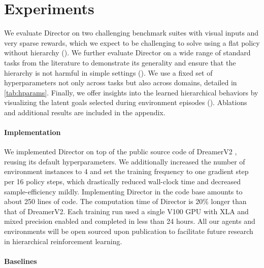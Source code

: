 


% 


\section{Experiments}
\label{sec:experiments}

We evaluate Director on two challenging benchmark suites with visual inputs and very sparse rewards, which we expect to be challenging to solve using a flat policy without hierarchy ().
We further evaluate Director on a wide range of standard tasks from the literature to demonstrate its generality and ensure that the hierarchy is not harmful in simple settings (). 
We use a fixed set of hyperparameters not only across tasks but also across domains, detailed in \cref{tab:hparams}. 
Finally, we offer insights into the learned hierarchical behaviors by visualizing the latent goals selected during environment episodes (). 
Ablations and additional results are included in the appendix.

\paragraph{Implementation}

We implemented Director on top of the public source code of DreamerV2 \citep{hafner2020dreamerv2}, reusing its default hyperparameters. 
We additionally increased the number of environment instances to 4 and set the training frequency to one gradient step per 16 policy steps, which drastically reduced wall-clock time and decreased sample-efficiency mildly. 
Implementing Director in the code base amounts to about 250 lines of code. 
The computation time of Director is 20\% longer than that of DreamerV2. 
Each training run used a single V100 GPU with XLA and mixed precision enabled and completed in less than 24 hours. 
All our agents and environments will be open sourced upon publication to facilitate future research in hierarchical reinforcement learning.

\paragraph{Baselines}

